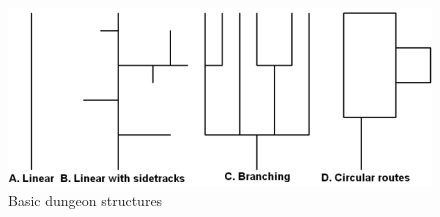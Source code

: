\begin{figure}[h]
    \caption{Basic dungeon structures}
    \centerline{\includegraphics[width=13cm]{images/introduction/basic_dungeon.png}}
    \label{fig:basic_dungeons}
\end{figure}



